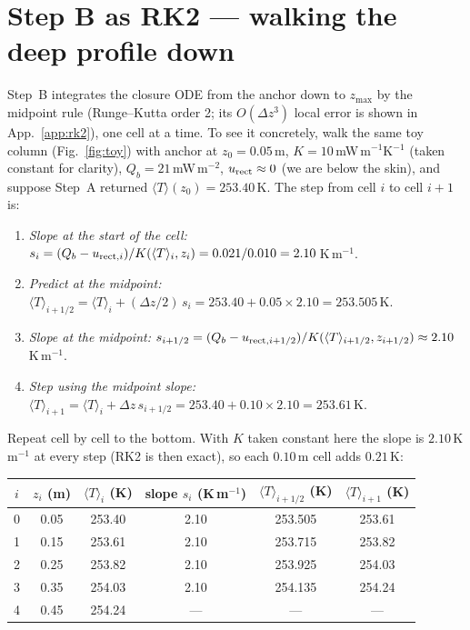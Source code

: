 \documentclass[11pt]{report}
\newcommand{\Tm}{\langle T\rangle}
\begin{document}
\section{Step B as RK2 --- walking the deep profile down}\label{sec:stepB}

Step~B integrates the closure ODE from the anchor down to $z_{\max}$ by the
midpoint rule (Runge--Kutta order 2; its $O(\Delta z^3)$ local error is shown in
App.~\ref{app:rk2}), one cell at a time. To see it concretely,
walk the same toy column (Fig.~\ref{fig:toy}) with anchor at $z_0=0.05$\,m,
$K=10$\,mW\,m$^{-1}$K$^{-1}$ (taken constant for clarity),
$Q_b=21$\,mW\,m$^{-2}$, $u_{\rm rect}\approx0$ (we are below the skin), and
suppose Step~A returned $\Tm(z_0)=253.40$\,K. The step from cell $i$ to cell
$i{+}1$ is:

\begin{enumerate}[leftmargin=1.4em,itemsep=3pt]
\item \emph{Slope at the start of the cell:}
  $s_i = (Q_b-u_{{\rm rect},i})/K(\Tm_i,z_i)= 0.021/0.010 = 2.10$\,K\,m$^{-1}$.
\item \emph{Predict at the midpoint:}
  $\Tm_{i+1/2} = \Tm_i + (\Delta z/2)\,s_i = 253.40 + 0.05\times2.10 = 253.505$\,K.
\item \emph{Slope at the midpoint:}
  $s_{i+1/2} = (Q_b-u_{{\rm rect},i+1/2})/K(\Tm_{i+1/2},z_{i+1/2}) \approx 2.10$\,K\,m$^{-1}$.
\item \emph{Step using the midpoint slope:}
  $\Tm_{i+1} = \Tm_i + \Delta z\,s_{i+1/2} = 253.40 + 0.10\times2.10 = 253.61$\,K.
\end{enumerate}

\noindent Repeat cell by cell to the bottom. With $K$ taken constant here the
slope is $2.10$\,K\,m$^{-1}$ at every step (RK2 is then exact), so each $0.10$\,m
cell adds $0.21$\,K:

\begin{center}\small
\begin{tabular}{@{}cccccc@{}}
\toprule
$i$ & $z_i$ (m) & $\Tm_i$ (K) & slope $s_i$ (K\,m$^{-1}$) & $\Tm_{i+1/2}$ (K) & $\Tm_{i+1}$ (K) \\
\midrule
0 & 0.05 & 253.40 & 2.10 & 253.505 & 253.61 \\
1 & 0.15 & 253.61 & 2.10 & 253.715 & 253.82 \\
2 & 0.25 & 253.82 & 2.10 & 253.925 & 254.03 \\
3 & 0.35 & 254.03 & 2.10 & 254.135 & 254.24 \\
4 & 0.45 & 254.24 & --- & --- & --- \\
\bottomrule
\end{tabular}
\end{center}
\end{document}
